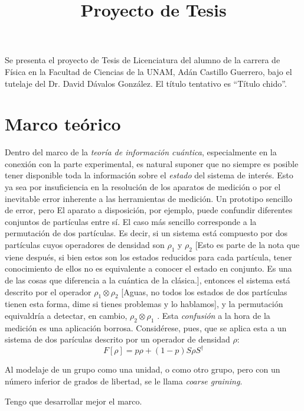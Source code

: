 \documentclass[onecolumn,11pt]{article}
\title{Proyecto de Tesis} \date{}
\newcommand{\nota}[1]{{\color{red} [#1]}}
\begin{document}
\maketitle
\thispagestyle{empty}
Se presenta el proyecto de Tesis de Licenciatura del alumno de la carrera de Física en la Facultad de Ciencias de la UNAM, Adán Castillo Guerrero, bajo el tutelaje del Dr. David Dávalos González. El título tentativo es ``Título chido''.

\section{Marco teórico}


Dentro del marco de la \textit{teoría de información cuántica}, especialmente en la conexión con la parte experimental, es natural suponer que no siempre es posible tener disponible toda la información sobre el \textit{estado} del sistema de interés. Esto ya sea por insuficiencia en la resolución de los aparatos de medición o por el inevitable error inherente a las herramientas de medición. Un prototipo sencillo de error, pero El aparato a disposición, por ejemplo, puede confundir diferentes conjuntos de partículas entre sí. El caso más sencillo corresponde a la permutación de dos partículas. Es decir, si un sistema está compuesto por dos partículas cuyos operadores de densidad son $\rho_{1}$ y $\rho_{2}$ \nota{Esto es parte de la nota que viene después, si bien estos son los estados reducidos para cada partícula, tener conocimiento de ellos no es equivalente a conocer el estado en conjunto. Es una de las cosas que diferencia a la cuántica de la clásica.}, entonces el sistema está descrito por el operador $\rho_{1}\otimes\rho_{2}$ \nota{Aguas, no todos los estados de dos partículas tienen esta forma, dime si tienes problemas y lo hablamos}, y la permutación equivaldría a detectar, en cambio, $\rho_{2}\otimes\rho_{1}$ \cite{FuzzyMeasurements}. Esta \textit{confusión} a la hora de la medición es una aplicación borrosa. Considérese, pues, que se aplica esta a un sistema de dos parículas descrito por un operador de densidad $\rho$:
\begin{equation}\label{eq:Fuzzy2}
F[\rho]=p\rho+(1-p)S\rho S^{\dag}
\end{equation}


Al modelaje de un grupo como una unidad, o como otro grupo, pero con un número inferior de grados de libertad, se le llama \textit{coarse graining}.


Tengo que desarrollar mejor el marco.
\end{document}
